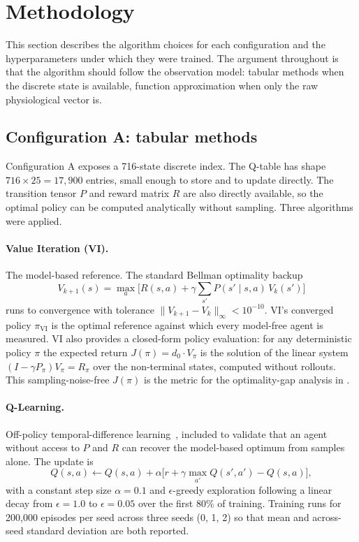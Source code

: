 \section{Methodology}
\label{sec:methodology}

This section describes the algorithm choices for each configuration and the hyperparameters under which they were trained. The argument throughout is that the algorithm should follow the observation model: tabular methods when the discrete state is available, function approximation when only the raw physiological vector is.

\subsection{Configuration A: tabular methods}
\label{sec:methodology-A}

Configuration A exposes a 716-state discrete index. The Q-table has shape $716 \times 25 = 17{,}900$ entries, small enough to store and to update directly. The transition tensor $P$ and reward matrix $R$ are also directly available, so the optimal policy can be computed analytically without sampling. Three algorithms were applied.

\paragraph{Value Iteration (VI).} The model-based reference. The standard Bellman optimality backup
\begin{equation}
V_{k+1}(s) = \max_a \big[ R(s,a) + \gamma \sum_{s'} P(s' \mid s, a)\, V_k(s') \big]
\end{equation}
runs to convergence with tolerance $\|V_{k+1} - V_k\|_\infty < 10^{-10}$. VI's converged policy $\pi_\text{VI}$ is the optimal reference against which every model-free agent is measured. VI also provides a closed-form policy evaluation: for any deterministic policy $\pi$ the expected return $J(\pi) = d_0 \cdot V_\pi$ is the solution of the linear system $(I - \gamma P_\pi) V_\pi = R_\pi$ over the non-terminal states, computed without rollouts. This sampling-noise-free $J(\pi)$ is the metric for the optimality-gap analysis in .

\paragraph{Q-Learning.} Off-policy temporal-difference learning~\citep{watkins1992qlearning,sutton2018reinforcement}, included to validate that an agent without access to $P$ and $R$ can recover the model-based optimum from samples alone. The update is
\begin{equation}
Q(s,a) \leftarrow Q(s,a) + \alpha \big[ r + \gamma \max_{a'} Q(s', a') - Q(s,a) \big],
\end{equation}
with a constant step size $\alpha = 0.1$ and $\epsilon$-greedy exploration following a linear decay from $\epsilon = 1.0$ to $\epsilon = 0.05$ over the first 80\% of training. Training runs for 200{,}000 episodes per seed across three seeds (0, 1, 2) so that mean and across-seed standard deviation are both reported.

